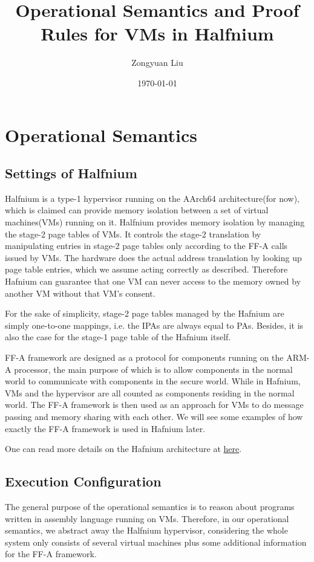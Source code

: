 \documentclass[a4paper]{article}
\title{Operational Semantics and Proof Rules for VMs in Halfnium}
\date{\today}
\author{Zongyuan Liu}
\begin{document}
\maketitle

\section{Operational Semantics}

\subsection{Settings of Halfnium}
Halfnium is a type-1 hypervisor running on the AArch64 architecture(for now),
which is claimed can provide memory isolation between a set of virtual
machines(VMs) running on it. Halfnium provides memory isolation by managing the
stage-2 page tables of VMs. It controls the stage-2 translation by manipulating
entries in stage-2 page tables only according to the FF-A calls issued by VMs.
The hardware does the actual address translation by looking up page table
entries, which we assume acting correctly as described. Therefore Hafnium can
guarantee that one VM can never access to the memory owned by another VM without
that VM's consent.

For the sake of simplicity, stage-2 page tables managed by the Hafnium are
simply one-to-one mappings, i.e. the IPAs are always equal to PAs. Besides, it
is also the case for the stage-1 page table of the Hafnium itself.

FF-A framework are designed as a protocol for components running on the ARM-A
processor, the main purpose of which is to allow components in the normal world
to communicate with components in the secure world. While in Hafnium, VMs and
the hypervisor are all counted as components residing in the normal world. The
FF-A framework is then used as an approach for VMs to do message passing and
memory sharing with each other. We will see some examples of how exactly the
FF-A framework is used in Hafnium later.

One can read more details on the Hafnium architecture at \href{https://review.trustedfirmware.org/plugins/gitiles/hafnium/hafnium/+/HEAD/docs/Architecture.md}{here}.

\subsection{Execution Configuration}
The general purpose of the operational semantics
is to reason about programs written in assembly language running on VMs.
Therefore, in our operational semantics, we abstract away the Halfnium
hypervisor, considering the whole system only consists of several virtual
machines plus some additional information for the FF-A framework.
\end{document}
